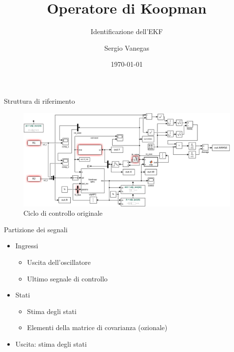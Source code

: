 \documentclass{beamer}
\title{Operatore di Koopman}
\subtitle{Identificazione dell'EKF}
\author{Sergio Vanegas}
\institute{Modelway S.r.l.}
\date{\today}
\begin{document}
\frame{\titlepage}

\begin{frame}{Struttura di riferimento}
    \begin{figure}
        \centering
        \includegraphics[width=\textwidth]{Figures/Kalman_nlMPC.png}
        \caption{Ciclo di controllo originale}
    \end{figure}
\end{frame}

\begin{frame}{Partizione dei segnali}
    \begin{itemize}
        \item Ingressi
        \begin{itemize}
            \item Uscita dell'oscillatore
            \item Ultimo segnale di controllo
        \end{itemize}
        \item Stati
        \begin{itemize}
            \item Stima degli stati
            \item Elementi della matrice di covarianza (ozionale)
        \end{itemize}
        \item Uscita: stima degli stati
    \end{itemize}
\end{frame}
\end{document}
